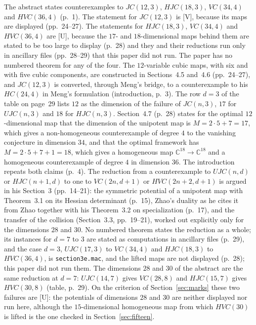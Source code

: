 \documentclass[11pt]{article}
\theoremstyle{remark}
\newcommand{\C}{\mathbb{C}}
\begin{document}
The abstract states counterexamples to $JC(12,3)$, $HJC(18,3)$, $VC(34,4)$ and $HVC(36,4)$ (p.~1). The statement for $JC(12,3)$ is [V], because its maps are displayed (pp.~24--27). The statements for $HJC(18,3)$, $VC(34,4)$ and $HVC(36,4)$ are [U], because the $17$- and $18$-dimensional maps behind them are stated to be too large to display (p.~28) and they and their reductions run only in ancillary files (pp.~28--29) that this paper did not run. The paper has no numbered theorem for any of the four. The $12$-variable cubic maps, with six and with five cubic components, are constructed in Sections~4.5 and~4.6 (pp.~24--27), and $JC(12,3)$ is converted, through Meng's bridge, to a counterexample to his $HC(24,4)$ in Meng's formulation (introduction, p.~3). The row $d=3$ of the table on page~29 lists $12$ as the dimension of the failure of $JC(n,3)$, $17$ for $UJC(n,3)$ and $18$ for $HJC(n,3)$. Section~4.7 (p.~28) states for the optimal $12$-dimensional map that the dimension of the unipotent map is $M=2\cdot5+7=17$, which gives a non-homogeneous counterexample of degree $4$ to the vanishing conjecture in dimension $34$, and that the optimal framework has $M=2\cdot5+7+1=18$, which gives a homogeneous map $\C^{18}\to\C^{18}$ and a homogeneous counterexample of degree $4$ in dimension $36$. The introduction repeats both claims (p.~4). The reduction from a counterexample to $UJC(n,d)$ or $HJC(n+1,d)$ to one to $VC(2n,d+1)$ or $HVC(2n+2,d+1)$ is argued in his Section~3 (pp.~14--21): the symmetric potential of a unipotent map with Theorem~3.1 on its Hessian determinant (p.~15), Zhao's duality as he cites it from Zhao together with his Theorem~3.2 on specialization (p.~17), and the transfer of the collision (Section~3.3, pp.~19--21), worked out explicitly only for the dimensions $28$ and $30$. No numbered theorem states the reduction as a whole; its instances for $d=7$ to $3$ are stated as computations in ancillary files (p.~29), and the case $d=3$, $UJC(17,3)$ to $VC(34,4)$ and $HJC(18,3)$ to $HVC(36,4)$, is \texttt{section3e.mac}, and the lifted maps are not displayed (p.~28); this paper did not run them. The dimensions $28$ and $30$ of the abstract are the same reduction at $d=7$: $UJC(14,7)$ gives $VC(28,8)$ and $HJC(15,7)$ gives $HVC(30,8)$ (table, p.~29). On the criterion of Section~\ref{sec:marks} these two failures are [U]: the potentials of dimensions $28$ and $30$ are neither displayed nor run here, although the $15$-dimensional homogeneous map from which $HVC(30)$ is lifted is the one checked in Section~\ref{sec:fifteen}.
\end{document}
